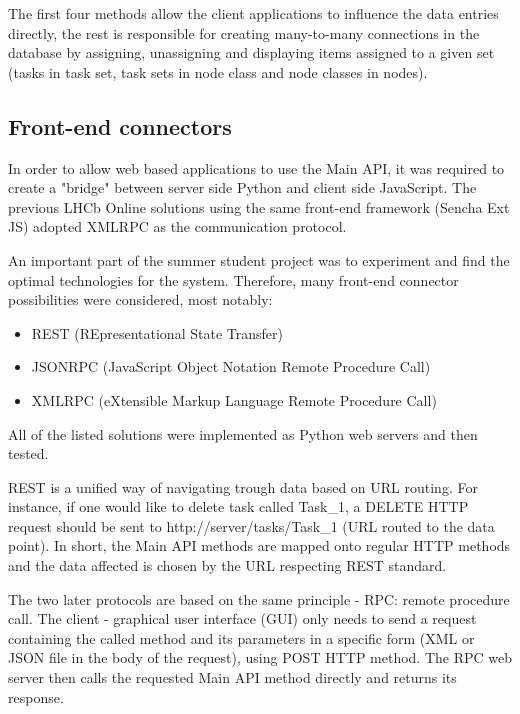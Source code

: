 \documentclass{customization}
\begin{document}
\noindent
The first four methods allow the client applications to influence the data entries directly, the rest is responsible for creating many-to-many connections in the database by assigning, unassigning and displaying items assigned to a given set (tasks in task set, task sets in node class and node classes in nodes).


\subsection{Front-end connectors}
\hspace{0.6cm}

In order to allow web based applications to use the Main API, it was required to create a "bridge" between server side Python and client side JavaScript. The previous LHCb Online solutions using the same front-end framework (Sencha Ext JS) adopted XMLRPC as the communication protocol.
\newline

\noindent
An important part of the summer student project was to experiment and find the optimal technologies for the system. Therefore, many front-end connector possibilities were considered, most notably:

\begin{itemize}
    \item REST (REpresentational State Transfer)
    \item JSONRPC (JavaScript Object Notation Remote Procedure Call)
    \item XMLRPC (eXtensible Markup Language Remote Procedure Call)
\end{itemize}

\noindent
All of the listed solutions were implemented as Python web servers and then tested. 
\newline 

\noindent
REST is a unified way of navigating trough data based on URL routing. For instance, if one would like to delete task called Task\_1, a DELETE HTTP request should be sent to http://server/tasks/Task\_1 (URL routed to the data point). In short, the Main API methods are mapped onto regular HTTP methods and the data affected is chosen by the URL respecting REST standard.
\newline

\noindent
The two later protocols are based on the same principle - RPC: remote procedure call. The client - graphical user interface (GUI) only needs to send a request containing the called method and its parameters in a specific form (XML or JSON file in the body of the request), using POST HTTP method. The RPC web server then calls the requested Main API method directly and returns its response.
\newline
\end{document}
